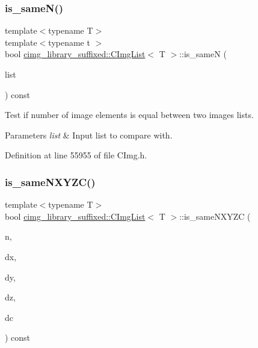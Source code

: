 \subsubsection{\texorpdfstring{is\+\_\+same\+N()}{is\_sameN()}\hspace{0.1cm}{\footnotesize\ttfamily [2/2]}}
{\footnotesize\ttfamily template$<$typename T$>$ \\
template$<$typename t $>$ \\
bool \hyperlink{structcimg__library__suffixed_1_1CImgList}{cimg\+\_\+library\+\_\+suffixed\+::\+C\+Img\+List}$<$ T $>$\+::is\+\_\+sameN (\begin{DoxyParamCaption}\item[{const \hyperlink{structcimg__library__suffixed_1_1CImgList}{C\+Img\+List}$<$ t $>$ \&}]{list }\end{DoxyParamCaption}) const\hspace{0.3cm}{\ttfamily [inline]}}



Test if number of image elements is equal between two images lists. 


\begin{DoxyParams}{Parameters}
{\em list} & Input list to compare with. \\
\hline
\end{DoxyParams}


Definition at line 55955 of file C\+Img.\+h.

\mbox{\label{structcimg__library__suffixed_1_1CImgList_a3703de66442f8e8ccfc83962e0e09d00}} 
\subsubsection{\texorpdfstring{is\+\_\+same\+N\+X\+Y\+Z\+C()}{is\_sameNXYZC()}}
{\footnotesize\ttfamily template$<$typename T$>$ \\
bool \hyperlink{structcimg__library__suffixed_1_1CImgList}{cimg\+\_\+library\+\_\+suffixed\+::\+C\+Img\+List}$<$ T $>$\+::is\+\_\+same\+N\+X\+Y\+ZC (\begin{DoxyParamCaption}\item[{const unsigned int}]{n,  }\item[{const unsigned int}]{dx,  }\item[{const unsigned int}]{dy,  }\item[{const unsigned int}]{dz,  }\item[{const unsigned int}]{dc }\end{DoxyParamCaption}) const\hspace{0.3cm}{\ttfamily [inline]}}



